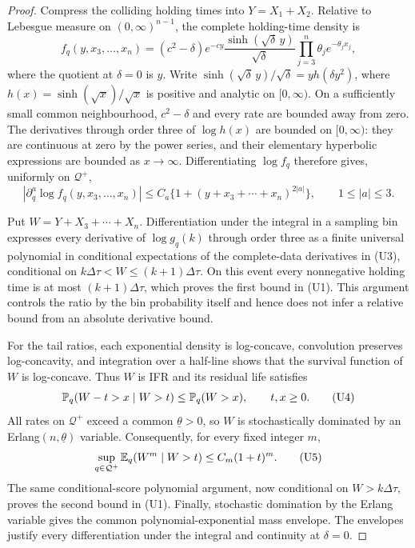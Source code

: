 \begin{proof}
Compress the colliding holding times into \(Y=X_1+X_2\).  Relative to
Lebesgue measure on \((0,\infty)^{n-1}\), the complete holding-time density is
\[
 f_q(y,x_3,\ldots,x_n)
 =(c^2-\delta)e^{-cy}\frac{\sinh(\sqrt\delta\,y)}{\sqrt\delta}
 \prod_{j=3}^n\theta_j e^{-\theta_jx_j},
\tag{U2}
\]
where the quotient at \(\delta=0\) is \(y\).  Write
\(\sinh(\sqrt\delta\,y)/\sqrt\delta=y h(\delta y^2)\), where
\(h(x)=\sinh(\sqrt x)/\sqrt x\) is positive and analytic on
\([0,\infty)\).  On a sufficiently small common neighbourhood,
\(c^2-\delta\) and every rate are bounded away from zero.  The derivatives
through order three of \(\log h(x)\) are bounded on \([0,\infty)\): they are
continuous at zero by the power series, and their elementary hyperbolic
expressions are bounded as \(x\to\infty\).  Differentiating \(\log f_q\)
therefore gives, uniformly on \(\mathcal Q^+\),
\[
 |\partial_q^a\log f_q(y,x_3,\ldots,x_n)|
 \le C_a\{1+(y+x_3+\cdots+x_n)^{2|a|}\},
 \qquad 1\le |a|\le3.
\tag{U3}
\]

Put \(W=Y+X_3+\cdots+X_n\).  Differentiation under the integral in a
sampling bin expresses every derivative of \(\log g_q(k)\) through order
three as a finite universal polynomial in conditional expectations of the
complete-data derivatives in \textup{(U3)}, conditional on
\(k\Delta\tau<W\le(k+1)\Delta\tau\).  On this event every nonnegative
holding time is at most \((k+1)\Delta\tau\), which proves the first bound in
\textup{(U1)}.  This argument controls the ratio by the bin probability
itself and hence does not infer a relative bound from an absolute derivative
bound.

For the tail ratios, each exponential density is log-concave, convolution
preserves log-concavity, and integration over a half-line shows that the
survival function of \(W\) is log-concave.  Thus \(W\) is IFR and its residual
life satisfies
\[
 \mathbb{P}_q(W-t>x\mid W>t)\le \mathbb{P}_q(W>x),\qquad t,x\ge0.
\tag{U4}
\]
All rates on \(\mathcal Q^+\) exceed a common \(\underline\theta>0\), so
\(W\) is stochastically dominated by an
Erlang\((n,\underline\theta)\) variable.  Consequently, for every fixed
integer \(m\),
\[
 \sup_{q\in\mathcal Q^+}\mathbb{E}_q(W^m\mid W>t)
 \le C_m(1+t)^m.
\tag{U5}
\]
The same conditional-score polynomial argument, now conditional on
\(W>k\Delta\tau\), proves the second bound in \textup{(U1)}.  Finally,
stochastic domination by the Erlang variable gives the common
polynomial-exponential mass envelope.  The envelopes justify every
differentiation under the integral and continuity at \(\delta=0\).
\end{proof}

